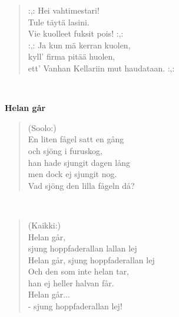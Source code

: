 \noindent\begin{minipage}{\linewidth}
\begin{verse}
	\hspace{0pt-\widthof{:,: }}:,: Hei vahtimestari!\\
	Tule täytä lasini.\\
	Vie kuolleet fuksit pois! :,:\\
	\hspace{0pt-\widthof{:,: }}:,: Ja kun mä kerran kuolen,\\
	kyll' firma pitää huolen,\\
	ett' Vanhan Kellariin mut haudataan. :,:\\
\end{verse}
\end{minipage}\\[10pt]
%
%
\noindent\begin{minipage}{\linewidth}
\vspace{5pt}
\parbox[t]{0.85\linewidth}{\raggedright {\large\bf Helan går}\\[6pt]}
\begin{verse}
	(Soolo:)\\
	En liten fågel satt en gång\\
	och sjöng i furuskog,\\
	han hade sjungit dagen lång\\
	men dock ej sjungit nog.\\
	Vad sjöng den lilla fågeln då?\\
\end{verse}
\end{minipage}\\[10pt]
\noindent\begin{minipage}{\linewidth}
\begin{verse}
	(Kaikki:)\\
	Helan går,\\
	sjung hoppfaderallan lallan lej\\
	Helan går, sjung hoppfaderallan lej\\
	Och den som inte helan tar,\\
	han ej heller halvan får.\\
	Helan går...\\
	- sjung hoppfaderallan lej!\\
\end{verse}
\end{minipage}\\[10pt]
